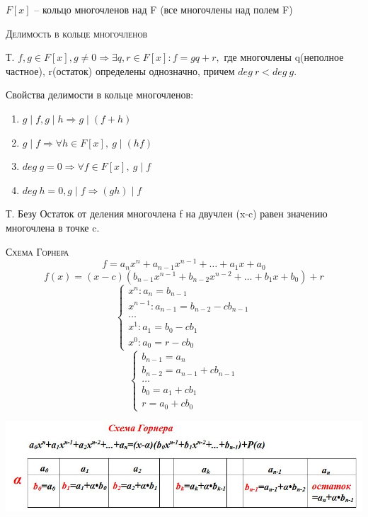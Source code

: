 \documentclass{article}
\begin{document}
$F[x]$ – кольцо многочленов над F (все многочлены над полем F)

\textsc{Делимость в кольце многочленов}

Т. $f, g\in F[x], g\neq 0\Rightarrow\exists q, r\in F[x]\colon f=gq+r,$ где многочлены q(неполное частное), r(остаток) определены однозначно, причем $deg\ r<deg\ g$.

Свойства делимости в кольце многочленов:
\begin{enumerate}
    \item $g\mid f, g\mid h \Rightarrow g\mid (f+h)$
    \item $g\mid f\Rightarrow \forall h\in F[x],\ g\mid (hf)$
    \item $deg\ g=0\Rightarrow \forall f\in F[x],\ g\mid f$
    \item $deg\ h=0, g\mid f\Rightarrow (gh)\mid f$
\end{enumerate}

Т. Безу Остаток от деления многочлена f на двучлен (x-c) равен значению многочлена в точке c.

\textsc{Схема Горнера}
$$f=a_nx^n+a_{n-1}x^{n-1}+\dots+a_1x+a_0$$
$$f(x)=(x-c)(b_{n-1}x^{n-1}+b_{n-2}x^{n-2}+\dots+b_1x+b_0)+r$$
\begin{equation*}
    \begin{cases}
        x^n: a_n=b_{n-1} \\
        x^{n-1}: a_{n-1}=b_{n-2}-cb_{n-1} \\
        \dots \\
        x^1: a_1=b_0-cb_1 \\
        x^0: a_0=r-cb_0
    \end{cases}
\end{equation*}
\begin{equation*}
    \begin{cases}
        b_{n-1}=a_n \\
        b_{n-2}=a_{n-1}+cb_{n-1} \\
        \dots \\
        b_0=a_1+cb_1 \\
        r=a_0+cb_0
    \end{cases}
\end{equation*}

\centerline{\includegraphics[width=0.7\linewidth]{gr62.jpeg}}
\end{document}
